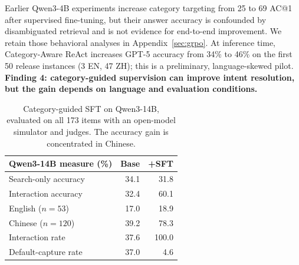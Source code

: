 Earlier Qwen3-4B experiments increase category targeting from 25 to 69 AC@1 after supervised fine-tuning, but their answer accuracy is confounded by disambiguated retrieval and is not evidence for end-to-end improvement. We retain those behavioral analyses in Appendix~\ref{sec:grpo}. At inference time, Category-Aware ReAct increases GPT-5 accuracy from 34\% to 46\% on the first 50 release instances (3 EN, 47 ZH); this is a preliminary, language-skewed pilot. \textbf{Finding 4: category-guided supervision can improve intent resolution, but the gain depends on language and evaluation conditions.}

\begin{table}[t]
\centering
\small
\begin{tabular}{@{}lrr@{}}
\toprule
Qwen3-14B measure (\%) & Base & +SFT \\
\midrule
Search-only accuracy & 34.1 & 31.8 \\
Interaction accuracy & 32.4 & 60.1 \\
\quad English ($n=53$) & 17.0 & 18.9 \\
\quad Chinese ($n=120$) & 39.2 & 78.3 \\
Interaction rate & 37.6 & 100.0 \\
Default-capture rate & 37.0 & 4.6 \\
\bottomrule
\end{tabular}
\caption{Category-guided SFT on Qwen3-14B, evaluated on all 173 items with an open-model simulator and judges. The accuracy gain is concentrated in Chinese.}
\label{tab:sft14b}
\end{table}
